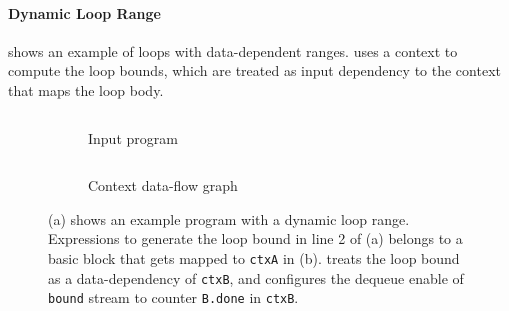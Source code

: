 \paragraph{Dynamic Loop Range}
 shows an example of loops with data-dependent ranges. 
\name uses a context to compute the loop bounds, which are treated as input dependency to the context 
that maps the loop body.
\begin{figure}
\centering
\begin{subfigure}[b]{0.4\textwidth}
\inputminted{python}{code/dynrange.py}
\caption{Input program}
\end{subfigure}
\hfill
\begin{subfigure}[b]{0.5\textwidth}
\inputminted{python}{code/dynrangectx.py}
\caption{Context data-flow graph}
\end{subfigure}
\caption[Dynamic loop range]{
  (a) shows an example program with a dynamic loop range. 
  Expressions to generate the loop bound in line 2 of (a) belongs to a basic block that gets mapped
  to \texttt{ctxA} in (b).
  \name treats the loop bound as a data-dependency of \texttt{ctxB}, and
  configures the dequeue enable of \texttt{bound} stream to counter \texttt{B.done} in \texttt{ctxB}.
}
\label{fig:dynrange}
\end{figure}

